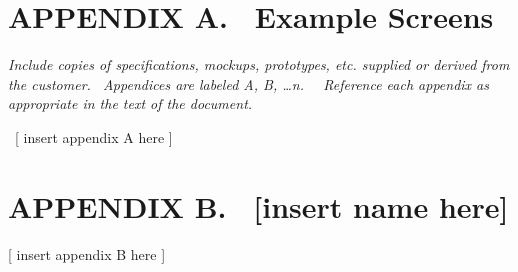 \documentclass[twoside,letterpaper]{article}
\begin{document}
\clearpage\section[APPENDIX A. \ Example Screens]{\rmfamily\bfseries\color{black}
APPENDIX A. \ Example Screens}

\bigskip

{\itshape\color{black}
Include copies of specifications, mockups, prototypes, etc. supplied or
derived from the customer. \ Appendices are labeled A, B, {\dots}n.
\ \ Reference each appendix as appropriate in the text of the document.
}

{\color{black}
\foreignlanguage{english}{\ }\foreignlanguage{english}{[ insert appendix
A here ]}}

\clearpage\section[APPENDIX B. \ [insert name
here{]}]{\rmfamily\bfseries\color{black}
APPENDIX B. \ [insert name here]}

\bigskip

{\color{black}
[ insert appendix B here ]}


\bigskip
\end{document}
